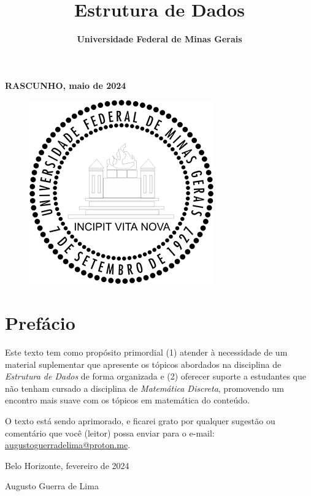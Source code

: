 \documentclass{article}
\title{\Huge\textbf{Estrutura de Dados}}
\author{}
\date{\textbf{Universidade Federal de Minas Gerais}}
\begin{document}
\maketitle
\textbf{RASCUNHO, maio de 2024}
\begin{figure}
  \centering
  \includegraphics[width=0.2\linewidth]{img/UFMG.png}
\end{figure}

\newpage

\large

\section*{Prefácio}

Este texto tem como propósito primordial (1) atender à necessidade de um material suplementar que apresente os tópicos abordados na disciplina de \textit{Estrutura de Dados} de forma organizada e (2) oferecer suporte a estudantes que não tenham cursado a disciplina de \textit{Matemática Discreta}, promovendo um encontro mais suave com os tópicos em matemática do conteúdo.

O texto está sendo aprimorado, e ficarei grato por qualquer sugestão ou comentário que você (leitor) possa enviar para o e-mail: \href{mailto:augustoguerradelima@proton.me}{augustoguerradelima@proton.me}.
\vspace{0.5cm}

{\raggedleft
Belo Horizonte, fevereiro de 2024

Augusto Guerra de Lima

\smiley{}
\par}

\newpage

\tableofcontents

\newpage














\end{document}
